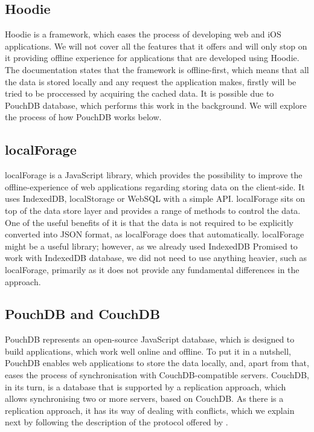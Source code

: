 \subsection*{Hoodie}

Hoodie is a framework, which eases the process of developing web and iOS applications. We will not cover all the features that it offers and will only stop on it providing offline experience for applications that are developed using Hoodie. The documentation states that the framework is offline-first\cite{23}, which means that all the data is stored locally and any request the application makes, firstly will be tried to be proccessed by acquiring the cached data. It is possible due to PouchDB database, which performs this work in the background\cite{24}. We will explore the process of how PouchDB works below.

\subsection*{localForage}

localForage is a JavaScript library, which provides the possibility to improve the offline-experience of web applications regarding storing data on the client-side. It uses IndexedDB, localStorage or WebSQL with a simple API. localForage sits on top of the data store layer and provides a range of methods to control the data. One of the useful benefits of it is that the data is not required to be explicitly converted into JSON format, as localForage does that automatically\cite{25}. localForage might be a useful library; however, as we already used IndexedDB Promised to work with IndexedDB database, we did not need to use anything heavier, such as localForage, primarily as it does not provide any fundamental differences in the approach.

\subsection*{PouchDB and CouchDB}

PouchDB represents an open-source JavaScript database, which is designed to build applications, which work well online and offline. To put it in a nutshell, PouchDB enables web applications to store the data locally, and, apart from that, eases the process of synchronisation with CouchDB-compatible servers. CouchDB, in its turn, is a database that is supported by a replication approach, which allows synchronising two or more servers, based on CouchDB. As there is a replication approach, it has its way of dealing with conflicts, which we explain next by following the description of the protocol offered by \citet{26}. 

